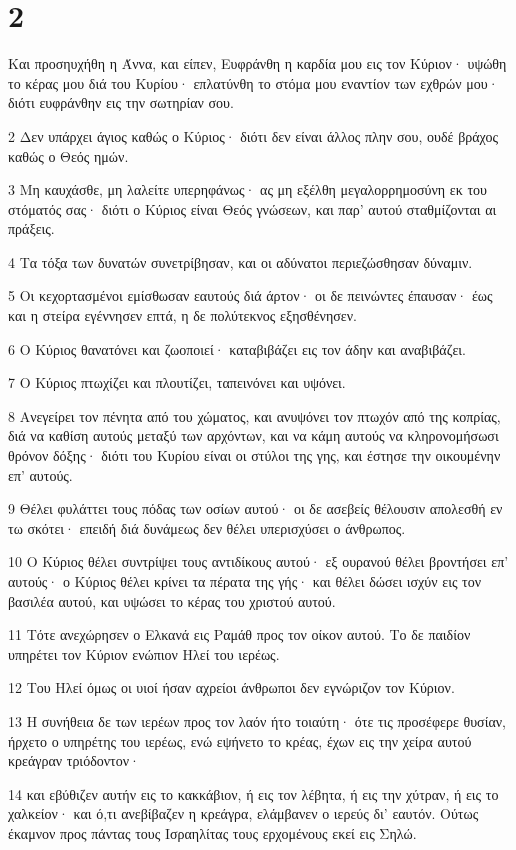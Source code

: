 \chapter{2}

\par Και προσηυχήθη η Άννα, και είπεν, Ευφράνθη η καρδία μου εις τον Κύριον· υψώθη το κέρας μου διά του Κυρίου· επλατύνθη το στόμα μου εναντίον των εχθρών μου· διότι ευφράνθην εις την σωτηρίαν σου.
\par 2 Δεν υπάρχει άγιος καθώς ο Κύριος· διότι δεν είναι άλλος πλην σου, ουδέ βράχος καθώς ο Θεός ημών.
\par 3 Μη καυχάσθε, μη λαλείτε υπερηφάνως· ας μη εξέλθη μεγαλορρημοσύνη εκ του στόματός σας· διότι ο Κύριος είναι Θεός γνώσεων, και παρ' αυτού σταθμίζονται αι πράξεις.
\par 4 Τα τόξα των δυνατών συνετρίβησαν, και οι αδύνατοι περιεζώσθησαν δύναμιν.
\par 5 Οι κεχορτασμένοι εμίσθωσαν εαυτούς διά άρτον· οι δε πεινώντες έπαυσαν· έως και η στείρα εγέννησεν επτά, η δε πολύτεκνος εξησθένησεν.
\par 6 Ο Κύριος θανατόνει και ζωοποιεί· καταβιβάζει εις τον άδην και αναβιβάζει.
\par 7 Ο Κύριος πτωχίζει και πλουτίζει, ταπεινόνει και υψόνει.
\par 8 Ανεγείρει τον πένητα από του χώματος, και ανυψόνει τον πτωχόν από της κοπρίας, διά να καθίση αυτούς μεταξύ των αρχόντων, και να κάμη αυτούς να κληρονομήσωσι θρόνον δόξης· διότι του Κυρίου είναι οι στύλοι της γης, και έστησε την οικουμένην επ' αυτούς.
\par 9 Θέλει φυλάττει τους πόδας των οσίων αυτού· οι δε ασεβείς θέλουσιν απολεσθή εν τω σκότει· επειδή διά δυνάμεως δεν θέλει υπερισχύσει ο άνθρωπος.
\par 10 Ο Κύριος θέλει συντρίψει τους αντιδίκους αυτού· εξ ουρανού θέλει βροντήσει επ' αυτούς· ο Κύριος θέλει κρίνει τα πέρατα της γής· και θέλει δώσει ισχύν εις τον βασιλέα αυτού, και υψώσει το κέρας του χριστού αυτού.
\par 11 Τότε ανεχώρησεν ο Ελκανά εις Ραμάθ προς τον οίκον αυτού. Το δε παιδίον υπηρέτει τον Κύριον ενώπιον Ηλεί του ιερέως.
\par 12 Του Ηλεί όμως οι υιοί ήσαν αχρείοι άνθρωποι δεν εγνώριζον τον Κύριον.
\par 13 Η συνήθεια δε των ιερέων προς τον λαόν ήτο τοιαύτη· ότε τις προσέφερε θυσίαν, ήρχετο ο υπηρέτης του ιερέως, ενώ εψήνετο το κρέας, έχων εις την χείρα αυτού κρεάγραν τριόδοντον·
\par 14 και εβύθιζεν αυτήν εις το κακκάβιον, ή εις τον λέβητα, ή εις την χύτραν, ή εις το χαλκείον· και ό,τι ανεβίβαζεν η κρεάγρα, ελάμβανεν ο ιερεύς δι' εαυτόν. Ούτως έκαμνον προς πάντας τους Ισραηλίτας τους ερχομένους εκεί εις Σηλώ.
